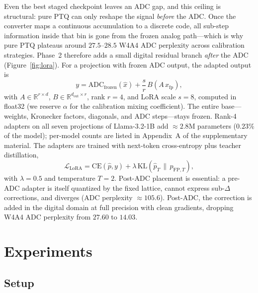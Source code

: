 \documentclass[letterpaper]{article} %
\theoremstyle{plain}
\begin{document}
Even the best staged checkpoint leaves an ADC gap, and this ceiling is structural: pure PTQ can only reshape the signal \emph{before} the ADC. Once the converter maps a continuous accumulation to a discrete code, all sub-step information inside that bin is gone from the frozen analog path---which is why pure PTQ plateaus around $27.5$--$28.5$ W4A4 ADC perplexity across calibration strategies. Phase~2 therefore adds a small digital residual branch \emph{after} the ADC (Figure~\ref{fig:lora}). For a projection with frozen ADC output, the adapted output is
\begin{equation}
    y = \mathrm{ADC}_{\mathrm{frozen}}(\hat{x}) + \frac{s}{r}\,B\!\left(A\,x_{\mathrm{fp}}\right),
    \label{eq:lora}
\end{equation}
with $A \in \mathbb{R}^{r\times d}$, $B \in \mathbb{R}^{d_{\mathrm{out}}\times r}$, rank $r = 4$, and LoRA scale $s = 8$, computed in float32 (we reserve $\alpha$ for the calibration mixing coefficient). The entire base---weights, Kronecker factors, diagonals, and ADC steps---stays frozen. Rank-4 adapters on all seven projections of Llama-3.2-1B add ${\approx}2.8$M parameters ($0.23\%$ of the model); per-model counts are listed in Appendix~A of the supplementary material. The adapters are trained with next-token cross-entropy plus teacher distillation,
\begin{equation}
    \mathcal{L}_{\mathrm{LoRA}} = \mathrm{CE}(\hat{p}, y) + \lambda\,\mathrm{KL}\!\left(\hat{p}_T \,\|\, p_{\mathrm{FP},T}\right),
    \label{eq:lora_loss}
\end{equation}
with $\lambda = 0.5$ and temperature $T = 2$. Post-ADC placement is essential: a pre-ADC adapter is itself quantized by the fixed lattice, cannot express sub-$\Delta$ corrections, and diverges (ADC perplexity $\approx 105.6$). Post-ADC, the correction is added in the digital domain at full precision with clean gradients, dropping W4A4 ADC perplexity from $27.60$ to $14.03$.

\section{Experiments}

\subsection{Setup}
\end{document}
